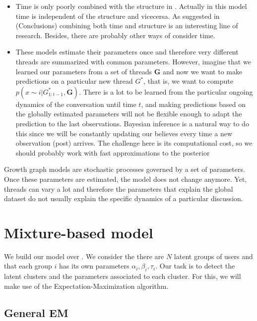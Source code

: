 \documentclass[smallextended]{svjour3}          %
\begin{document}
\begin{itemize}
	\item Time is only poorly combined with the structure in \cite{Wang2012e}. Actually in this model time is independent of the structure and vicecersa. As suggested in \cite{Gomez2012} (Conclusions) combining both time and structure is an interesting line of research. Besides, there are probably other ways of consider time.
	
	\item These models estimate their parameters once and therefore very different threads are summarized with common parameters. However, imagine that we learned our parameters from a set of threads $\mathbf{G}$ and now we want to make predictions on a particular new thread $G^*$, that is, we want to compute $p(x \sim i | G_{1:t-1}^*, \mathbf{G})$. There is a lot to be learned from the particular ongoing dynamics of the conversation until time $t$, and making predictions based on the globally estimated parameters will not be flexible enough to adapt the prediction to the last observations. Bayesian inference is a natural way to do this since we will be constantly updating our believes every time a new observation (post) arrives. The challenge here is its computational cost, so we should  
	probably work with fast approximations to the posterior
\end{itemize}
Growth graph models are stochastic processes governed by a set of parameters. Once these parameters are estimated, the model does not change anymore. Yet, threads can vary a lot and therefore the parameters that explain the global dataset do not usually explain the specific dynamics of a particular discussion. 

\section{Mixture-based model}

We build our model over \cite{Gomez2012}. We consider the there are $N$ latent groups of users and that each group $i$ has its own parameters $\alpha_i, \beta_i, \tau_i$. Our task is to detect the latent clusters and the parameters associated to each cluster. For this, we will make use of the Expectation-Maximization algorithm.

\subsection{General EM} 
\end{document}
